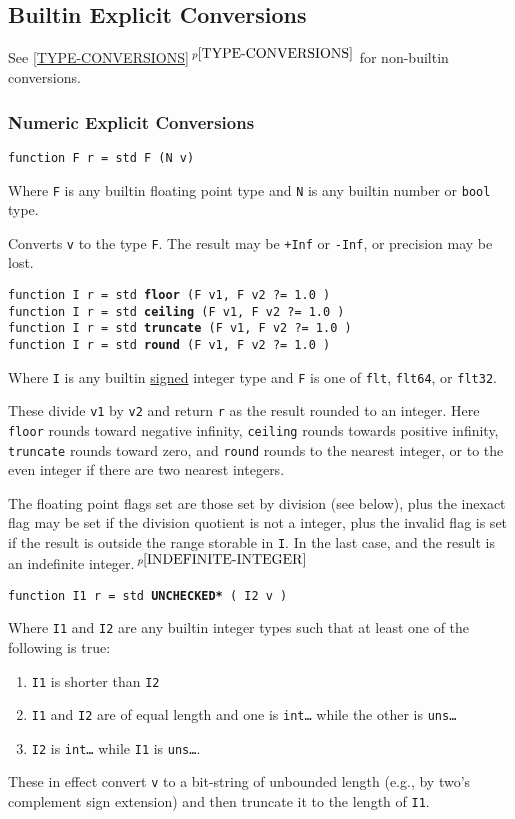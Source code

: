 \documentclass[12pt]{article}
\newcommand{\ttkey}[1]{{\tt \bfseries #1}}
\newcommand{\itemref}[1]{\ref{#1}$\,^{p\pageref{#1}}$}
\newcommand{\pagnote}[1]{$\,^{p\pageref{#1}}$}
\newenvironment{indpar}[1][0.3in]%
	{\begin{list}{}%
		     {\setlength{\itemsep}{0in}%
		      \setlength{\topsep}{0in}%
		      \setlength{\parsep}{1ex}%
		      \setlength{\labelwidth}{#1}%
		      \setlength{\leftmargin}{#1}%
		      \addtolength{\leftmargin}{\labelsep}}%
	 \item}%
	{\end{list}}
\begin{document}
\subsection{Builtin Explicit Conversions}
\label{BUILTIN-EXPLICIT-CONVERSIONS}

See \itemref{TYPE-CONVERSIONS} for non-builtin conversions.

\subsubsection{Numeric Explicit Conversions}

{\tt function F r = std F (N v)}
\begin{indpar}
Where {\tt F} is any builtin floating point type
and {\tt N} is any builtin number or {\tt bool} type.

Converts {\tt v} to the type {\tt F}.  The result may be
{\tt +Inf} or {\tt -Inf}, or precision may be lost.
\end{indpar}

{\tt function I r = std \ttkey{floor} (F v1, F v2 ?=~1.0 )} \\
{\tt function I r = std \ttkey{ceiling} (F v1, F v2 ?=~1.0 )} \\
{\tt function I r = std \ttkey{truncate} (F v1, F v2 ?=~1.0 )} \\
{\tt function I r = std \ttkey{round} (F v1, F v2 ?=~1.0 )}
\begin{indpar}
Where {\tt I} is any builtin \underline{signed} integer type
and {\tt F} is one of {\tt flt}, {\tt flt64}, or {\tt flt32}.

These divide {\tt v1} by {\tt v2} and return {\tt r} as the
result rounded to an integer.
Here {\tt floor} rounds toward negative infinity, {\tt ceiling}
rounds towards positive infinity, {\tt truncate} rounds toward
zero, and {\tt round} rounds to the nearest integer, or to the
even integer if there are two nearest integers.

The floating point flags set are those set by division (see below), plus the
inexact flag may be set if the division quotient is not a integer, plus
the invalid flag is set if the result is outside the range storable in
{\tt I}.  In the last case, and the result is
an indefinite integer.\pagnote{INDEFINITE-INTEGER}
\end{indpar}

{\tt function I1 r = std \ttkey{*UNCHECKED*} ( I2 v )}
\begin{indpar}
Where {\tt I1} and {\tt I2} are any builtin integer types
such that at least one of the following is true:
\begin{enumerate}
\item {\tt I1} is shorter than {\tt I2}
\item {\tt I1} and {\tt I2} are of equal length and one
is {\tt int\ldots} while the other is {\tt uns\ldots}
\item {\tt I2} is {\tt int\ldots} while {\tt I1} is {\tt uns\ldots}.
\end{enumerate}

These in effect convert {\tt v} to a bit-string of unbounded length (e.g., by
two's complement sign extension) and
then truncate it to the length of {\tt I1}.
\end{indpar}
\end{document}
